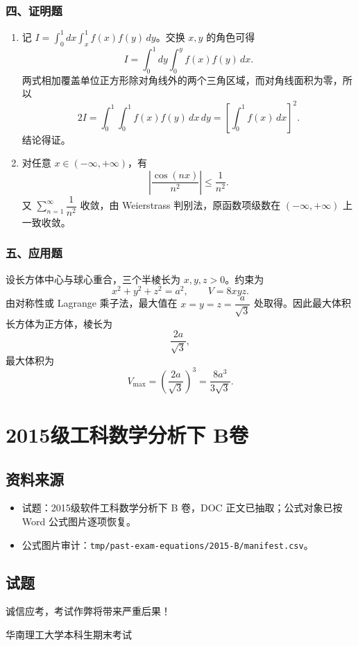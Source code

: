\subsubsection*{四、证明题}
\begin{enumerate}
  \item 记 $I=\int_0^1 dx\int_x^1 f(x)f(y)\,dy$。交换 $x,y$ 的角色可得
  \[
  I=\int_0^1 dy\int_0^y f(x)f(y)\,dx.
  \]
  两式相加覆盖单位正方形除对角线外的两个三角区域，而对角线面积为零，所以
  \[
  2I=\int_0^1\int_0^1 f(x)f(y)\,dx\,dy
  =\left[\int_0^1 f(x)\,dx\right]^2.
  \]
  结论得证。
  \item 对任意 $x\in(-\infty,+\infty)$，有
  \[
  \left|\frac{\cos(nx)}{n^2}\right|\le \frac1{n^2}.
  \]
  又 $\sum_{n=1}^{\infty}\dfrac1{n^2}$ 收敛，由 Weierstrass 判别法，原函数项级数在 $(-\infty,+\infty)$ 上一致收敛。
\end{enumerate}

\subsubsection*{五、应用题}
设长方体中心与球心重合，三个半棱长为 $x,y,z>0$。约束为
\[
x^2+y^2+z^2=a^2,\qquad V=8xyz.
\]
由对称性或 Lagrange 乘子法，最大值在 $x=y=z=\dfrac a{\sqrt3}$ 处取得。因此最大体积长方体为正方体，棱长为
\[
\frac{2a}{\sqrt3},
\]
最大体积为
\[
V_{\max}=\left(\frac{2a}{\sqrt3}\right)^3=\frac{8a^3}{3\sqrt3}.
\]

\section{2015级工科数学分析下 B卷}

\subsection{资料来源}
\begin{itemize}
  \item 试题：2015级软件工科数学分析下 B 卷，DOC 正文已抽取；公式对象已按 Word 公式图片逐项恢复。
  \item 公式图片审计：\texttt{tmp/past-exam-equations/2015-B/manifest.csv}。
\end{itemize}

\subsection{试题}
诚信应考，考试作弊将带来严重后果！

华南理工大学本科生期末考试

